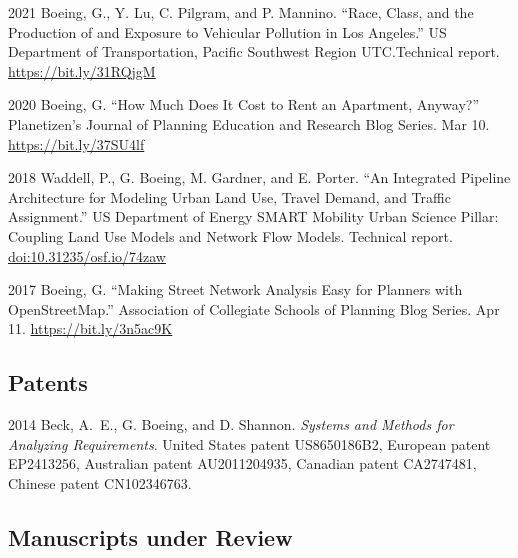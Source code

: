 \documentclass[12pt,letterpaper]{report}
\begin{document}
    \begin{tablist}

        \item[2021] \tab{}Boeing, G., Y. Lu, C. Pilgram, and P. Mannino. \enquote{Race, Class, and the Production of and Exposure to Vehicular Pollution in Los Angeles.} US Department of Transportation, Pacific Southwest Region UTC.\@ Technical report. \href{https://bit.ly/31RQjgM}{https://bit.ly/31RQjgM}

        \item[2020] \tab{}Boeing, G. \enquote{How Much Does It Cost to Rent an Apartment, Anyway?} Planetizen's Journal of Planning Education and Research Blog Series. Mar 10. \href{https://bit.ly/37SU4lf}{https://bit.ly/37SU4lf}

        \item[2018] \tab{}Waddell, P., G. Boeing, M. Gardner, and E. Porter. \enquote{An Integrated Pipeline Architecture for Modeling Urban Land Use, Travel Demand, and Traffic Assignment.} US Department of Energy SMART Mobility Urban Science Pillar: Coupling Land Use Models and Network Flow Models. Technical report. \href{https://doi.org/10.31235/osf.io/74zaw}{doi:10.31235/osf.io/74zaw}

        \item[2017] \tab{}Boeing, G. \enquote{Making Street Network Analysis Easy for Planners with OpenStreetMap.} Association of Collegiate Schools of Planning Blog Series. Apr 11. \href{https://bit.ly/3n5ac9K}{https://bit.ly/3n5ac9K}

    \end{tablist}



    \subsection*{Patents}

    \begin{tablist}

        \item[2014] \tab{}Beck, A.~E., G. Boeing, and D. Shannon. \textit{Systems and Methods for Analyzing Requirements}. United States patent US8650186B2, European patent EP2413256, Australian patent AU2011204935, Canadian patent CA2747481, Chinese patent CN102346763.


    \end{tablist}



    \subsection*{Manuscripts under Review}
\end{document}
